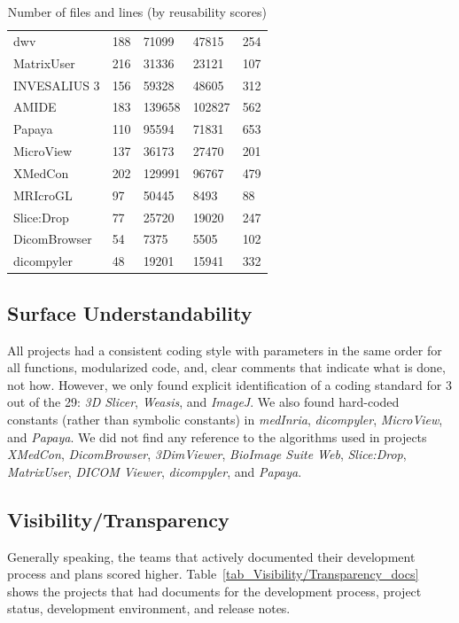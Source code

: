 \documentclass[final, 12pt, 3p, times]{elsarticle}
\begin{document}
\begin{table}[ht]
\begin{tabular}{lllll}
dwv & 188 & 71099 & 47815 & 254 \\
MatrixUser & 216 & 31336 & 23121 & 107 \\
INVESALIUS 3 & 156 & 59328 & 48605 & 312 \\
AMIDE & 183 & 139658 & 102827 & 562 \\
Papaya & 110 & 95594 & 71831 & 653 \\
MicroView & 137 & 36173 & 27470 & 201 \\
XMedCon & 202 & 129991 & 96767 & 479 \\
MRIcroGL & 97 & 50445 & 8493 & 88 \\
Slice:Drop & 77 & 25720 & 19020 & 247 \\
DicomBrowser & 54 & 7375 & 5505 & 102 \\
dicompyler & 48 & 19201 & 15941 & 332 \\ 
\bottomrule
\end{tabular}
\caption{Number of files and lines (by reusability scores)}
\label{tab_loc_per_file}
\end{table}

\subsection{Surface Understandability} \label{sec_result_understandability}

All projects had a consistent coding style with parameters in
the same order for all functions, modularized code, and, clear comments that
indicate what is done, not how. However, we only found explicit identification
of a coding standard for 3 out of the 29: \textit{3D Slicer}, \textit{Weasis},
and \textit{ImageJ}. We also found hard-coded constants (rather than symbolic
constants) in \textit{medInria}, \textit{dicompyler}, \textit{MicroView}, and
\textit{Papaya}. We did not find any reference to the algorithms used in
projects \textit{XMedCon}, \textit{DicomBrowser}, \textit{3DimViewer},
\textit{BioImage Suite Web}, \textit{Slice:Drop}, \textit{MatrixUser},
\textit{DICOM Viewer}, \textit{dicompyler}, and \textit{Papaya}. 

\subsection{Visibility/Transparency} \label{sec_result_visibility_transparency}

Generally speaking, the teams that actively documented
their development process and plans scored higher.
Table~\ref{tab_Visibility/Transparency_docs} shows the projects that had
documents for the development process, project status, development environment,
and release notes.
\end{document}
